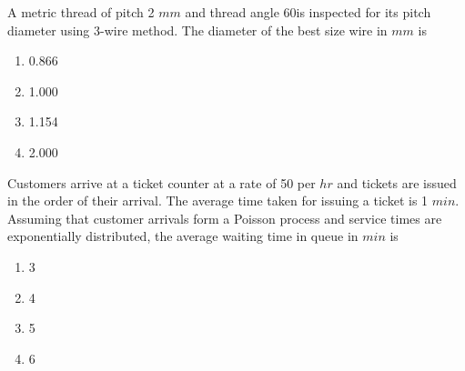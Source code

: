 \item A metric thread of pitch 2 $mm$ and thread angle 60\degree is inspected for its pitch diameter using 3-wire method. The diameter of the best size wire in $mm$ is 
  \begin{enumerate}
   \item 0.866
   \item 1.000
   \item 1.154
   \item 2.000 \\
\end{enumerate}
\item Customers arrive at a ticket counter at a rate of 50 per $hr$ and tickets are issued in the order of their arrival. The average time taken for issuing a ticket is 1 $min$. Assuming that customer arrivals form a Poisson process and service times are exponentially distributed, the average waiting time in queue in $min$ is
\begin{enumerate}
    \item 3
    \item 4
    \item 5
    \item 6 \\
\end{enumerate}
